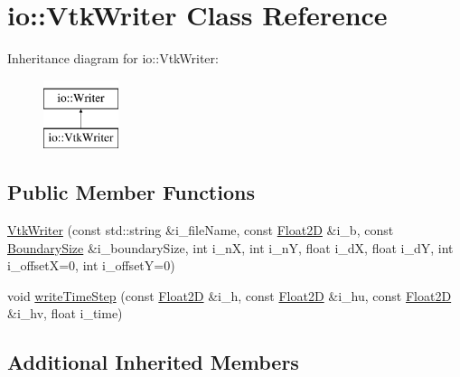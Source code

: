 \hypertarget{classio_1_1VtkWriter}{\section{io\-:\-:Vtk\-Writer Class Reference}
\label{classio_1_1VtkWriter}
}
Inheritance diagram for io\-:\-:Vtk\-Writer\-:\begin{figure}[H]
\begin{center}
\leavevmode
\includegraphics[height=2.000000cm]{classio_1_1VtkWriter}
\end{center}
\end{figure}
\subsection*{Public Member Functions}
\begin{DoxyCompactItemize}
\item 
\hyperlink{classio_1_1VtkWriter_aaed37669d1c38bafaf3fc36169342720}{Vtk\-Writer} (const std\-::string \&i\-\_\-file\-Name, const \hyperlink{classFloat2D}{Float2\-D} \&i\-\_\-b, const \hyperlink{structio_1_1BoundarySize}{Boundary\-Size} \&i\-\_\-boundary\-Size, int i\-\_\-n\-X, int i\-\_\-n\-Y, float i\-\_\-d\-X, float i\-\_\-d\-Y, int i\-\_\-offset\-X=0, int i\-\_\-offset\-Y=0)
\item 
void \hyperlink{classio_1_1VtkWriter_ad464e594a34f4cd94b02087a2fade7bf}{write\-Time\-Step} (const \hyperlink{classFloat2D}{Float2\-D} \&i\-\_\-h, const \hyperlink{classFloat2D}{Float2\-D} \&i\-\_\-hu, const \hyperlink{classFloat2D}{Float2\-D} \&i\-\_\-hv, float i\-\_\-time)
\end{DoxyCompactItemize}
\subsection*{Additional Inherited Members}


